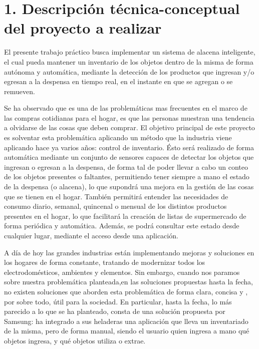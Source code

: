 \documentclass[
11pt, %
codirector, %
]{charter}
\begin{document}
\section{1. Descripción técnica-conceptual del proyecto a realizar}
\label{sec:descripcion}



El presente trabajo práctico busca implementar un sistema de alacena inteligente, el cual pueda mantener un inventario de los objetos dentro de la misma de forma autónoma y automática, mediante la detección de los productos que ingresan y/o egresan a la despensa en tiempo real, en el instante en que se agregan o se remueven.

Se ha observado que es una de las problemáticas mas frecuentes en el marco de las compras cotidianas para el hogar, es que las personas muestran una tendencia a olvidarse de las cosas que deben comprar. El objetivo principal de este proyecto es solventar esta problemática aplicando un método que la industria viene aplicando hace ya varios años: control de inventario. Ésto será realizado de forma automática mediante un conjunto de sensores capaces de detectar los objetos que ingresan o egresan a la despensa, de forma tal de poder llevar a cabo un conteo de los objetos presentes o faltantes, permitiendo tener siempre a mano el estado de la despensa (o alacena), lo que supondrá una mejora en la gestión de las cosas que se tienen en el hogar. También permitirá entender las necesidades de consumo diario, semanal, quincenal o mensual de los distintos productos presentes en el hogar, lo que facilitará la creación de listas de supermercado de forma periódica y automática. Además, se podrá consultar este estado desde cualquier lugar, mediante el acceso desde una aplicación. 

A día de hoy las grandes industrias están implementando mejoras y soluciones en los hogares de forma constante, tratando de modernizar todos los electrodomésticos, ambientes y elementos. Sin embargo, cuando nos paramos sobre nuestra problemática planteada,en las soluciones propuestas hasta la fecha, no existen soluciones que aborden esta problemática de forma clara, concisa y , por sobre todo, útil para la sociedad. En particular, hasta la fecha, lo más parecido a lo que se ha planteado, consta de una solución propuesta por Samsung: ha integrado a sus heladeras una aplicación que lleva un inventariado de la misma, pero de forma manual, siendo el usuario quien ingresa a mano qué objetos ingresa, y qué objetos utiliza o extrae.
\end{document}
